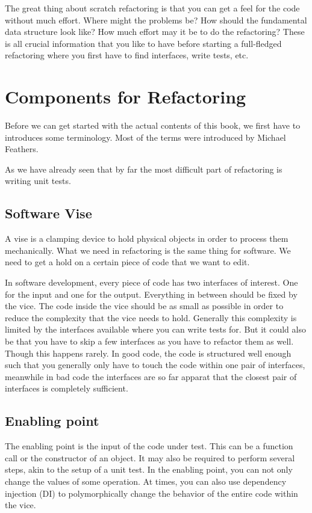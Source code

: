 The great thing about scratch refactoring is that you can get a feel for the code without much effort. Where might the problems be? How should the fundamental data structure look like? How much effort may it be to do the refactoring? These is all crucial information that you like to have before starting a full-fledged refactoring where you first have to find interfaces, write tests, etc.

\section{Components for Refactoring}

Before we can get started with the actual contents of this book, we first have to introduces some terminology. Most of the terms were introduced by Michael Feathers.

As we have already seen that by far the most difficult part of refactoring is writing unit tests. 

\subsection{Software Vise}

A vise is a clamping device to hold physical objects in order to process them mechanically. What we need in refactoring is the same thing for software. We need to get a hold on a certain piece of code that we want to edit.

In software development, every piece of code has two interfaces of interest. One for the input and one for the output. Everything in between should be fixed by the vice. The code inside the vice should be as small as possible in order to reduce the complexity that the vice needs to hold. Generally this complexity is limited by the interfaces available where you can write tests for. But it could also be that you have to skip a few interfaces as you have to refactor them as well. Though this happens rarely. In good code, the code is structured well enough such that you generally only have to touch the code within one pair of interfaces, meanwhile in bad code the interfaces are so far apparat that the closest pair of interfaces is completely sufficient.

\subsection{Enabling point}

The enabling point is the input of the code under test. This can be a function call or the constructor of an object. It may also be required to perform several steps, akin to the setup of a unit test. In the enabling point, you can not only change the values of some operation. At times, you can also use dependency injection (DI) to polymorphically change the behavior of the entire code within the vice.


